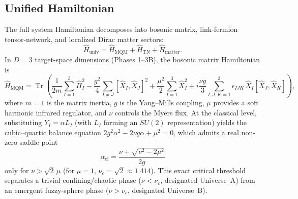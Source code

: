 \documentclass[11pt,a4paper]{article}
\DeclareMathOperator{\Tr}{Tr}
\begin{document}
\subsection{Unified Hamiltonian}
The full system Hamiltonian decomposes into bosonic matrix, link-fermion tensor-network, and localized Dirac matter sectors:
\begin{equation}
  \hat{H}_{\mathrm{univ}} = \hat{H}_{\mathrm{MQM}} + \hat{H}_{\mathrm{TN}} + \hat{H}_{\mathrm{matter}}.
  \label{eq:Huniv}
\end{equation}
In $D=3$ target-space dimensions (Phases 1--3B), the bosonic matrix Hamiltonian is
\begin{equation}
  \hat{H}_{\mathrm{MQM}} = \Tr\!\left(
    \frac{1}{2m}\sum_{I=1}^{3} \hat{\Pi}_I^2
    - \frac{g^2}{4}\sum_{I\neq J} [\hat{X}_I, \hat{X}_J]^2
    + \frac{\mu^2}{2}\sum_{I=1}^{3} \hat{X}_I^2
    + i\frac{\nu g}{3}\sum_{I,J,K=1}^{3} \epsilon_{IJK}\,\hat{X}_I[\hat{X}_J,\hat{X}_K]
  \right),
  \label{eq:Hmqm}
\end{equation}
where $m=1$ is the matrix inertia, $g$ is the Yang--Mills coupling, $\mu$ provides a soft harmonic infrared regulator, and $\nu$ controls the Myers flux. At the classical level, substituting $Y_I = \alpha L_I$ (with $L_I$ forming an $SU(2)$ representation) yields the cubic--quartic balance equation $2 g^2 \alpha^2 - 2\nu g\alpha + \mu^2 = 0$, which admits a real non-zero saddle point
\begin{equation}
  \alpha_{\mathrm{cl}} = \frac{\nu + \sqrt{\nu^2 - 2\mu^2}}{2g}
  \label{eq:alpha_cl}
\end{equation}
only for $\nu > \sqrt{2}\,\mu$ (for $\mu=1$, $\nu_c = \sqrt{2} \approx 1.414$). This exact critical threshold separates a trivial confining/chaotic phase ($\nu < \nu_c$, designated Universe~A) from an emergent fuzzy-sphere phase ($\nu > \nu_c$, designated Universe~B).
\end{document}
